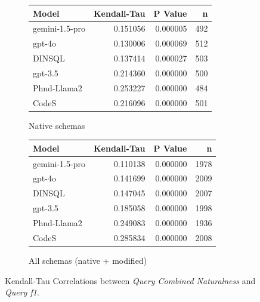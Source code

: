 \begin{figure}
  \centering
  \begin{subfigure}{.5\linewidth}
      \centering
      \begin{tabular}{lrrr}
\toprule
Model & Kendall-Tau & P Value & n \\
\midrule
gemini-1.5-pro & 0.151056 & 0.000005 & 492 \\
gpt-4o & 0.130006 & 0.000069 & 512 \\
DINSQL & 0.137414 & 0.000027 & 503 \\
gpt-3.5 & 0.214360 & 0.000000 & 500 \\
Phnd-Llama2 & 0.253227 & 0.000000 & 484 \\
CodeS & 0.216096 & 0.000000 & 501 \\
\bottomrule
\end{tabular}

      \caption{Native schemas}
      \label{table:f1ktaunative}
  \end{subfigure}%
  \begin{subfigure}{.5\linewidth}
      \centering
      \begin{tabular}{lrrr}
\toprule
Model & Kendall-Tau & P Value & n \\
\midrule
gemini-1.5-pro & 0.110138 & 0.000000 & 1978 \\
gpt-4o & 0.141699 & 0.000000 & 2009 \\
DINSQL & 0.147045 & 0.000000 & 2007 \\
gpt-3.5 & 0.185058 & 0.000000 & 1998 \\
Phnd-Llama2 & 0.249083 & 0.000000 & 1936 \\
CodeS & 0.285834 & 0.000000 & 2008 \\
\bottomrule
\end{tabular}

      \caption{All schemas (native + modified)}
      \label{table:f1ktauall}
  \end{subfigure}
  \caption{Kendall-Tau Correlations between \emph{Query Combined Naturalness} and \emph{Query f1}.}
\end{figure}

